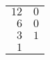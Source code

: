 \documentclass{script}
\begin{document}
\begin{table*}[htbp!]
    \centering
    \begin{tabular}{rr}
        \multicolumn{1}{r|}{$12$} & $0$ \\ \cline{1-1}
        \multicolumn{1}{r|}{$6$}  & $0$ \\ \cline{1-1}
        \multicolumn{1}{r|}{$3$}  & $1$ \\ \cline{1-1}
        $1$                       &
    \end{tabular}
\end{table*}
\end{document}
